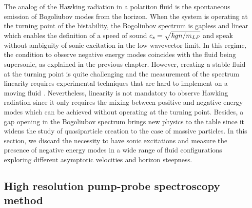 The analog of the Hawking radiation in a polariton fluid is the spontaneous emission of Bogoliubov modes from the horizon. When the system is operating at the turning point of the bistability, the Bogoliubov spectrum 
is gapless and linear which enables the definition of a speed of sound $c_s = \sqrt{\hbar g n /m_{LP}}$ and speak without ambiguity of sonic excitation in the low wavevector limit. In this regime, the condition to observe negative energy modes coincides with the fluid being supersonic, as explained in the previous chapter. 
However, creating a stable fluid at the turning point is quite challenging and the measurement of the spectrum linearity requires experimental techniques that are hard to implement on a moving fluid \cite{claude_phd}. Nevertheless, linearity is not mandatory to observe Hawking radiation since 
it only requires the mixing between positive and negative energy modes which can be achieved without operating at the turning point. Besides, a gap opening in the Bogoliubov spectrum brings new physics to the table since it widens the study of quasiparticle creation to the case of massive particles. In this
section, we discard the necessity to have sonic excitations and measure the presence of negative energy modes in a wide range of fluid configurations exploring different asymptotic velocities and horizon steepness.




\subsection{High resolution pump-probe spectroscopy method}



